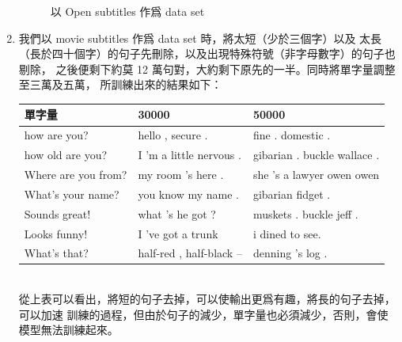 \documentclass[12pt, a4paper]{article}
\theoremstyle{mystyle}	%
\begin{document}
\begin{enumerate}
\begin{figure}[!htb]
    \caption{以 Open subtitles 作爲 data set}
    \label{fig:open-per}
   \endminipage
  \end{figure}
\item 我們以 movie subtitles 作爲 data set 時，將太短（少於三個字）以及
  太長（長於四十個字）的句子先刪除，以及出現特殊符號（非字母數字）的句子也剔除，
  之後便剩下約莫 12 萬句對，大約剩下原先的一半。同時將單字量調整至三萬及五萬，
  所訓練出來的結果如下：\\
  \begin{tabular}{lll}
    \hline
    單字量              & 30000                    & 50000 \\
    \hline
    \hline
    how are you?        & hello , secure .         & fine . domestic .\\
    \hline
    how old are you?    & I 'm a little nervous .  & gibarian . buckle wallace .\\
    \hline
    Where are you from? & my room 's here .        & she 's a lawyer owen owen \\
    \hline
    What's your name?   & you know my name .       & gibarian fidget .\\
    \hline
    Sounds great!       & what 's he got ?         & muskets . buckle jeff .\\
    \hline
    Looks funny!        & I 've got a trunk        & i dined to see.\\
    \hline
    What's that?        & half-red , half-black -- & denning 's log .\\
    \hline
  \end{tabular} \\
  從上表可以看出，將短的句子去掉，可以使輸出更爲有趣，將長的句子去掉，可以加速
  訓練的過程，但由於句子的減少，單字量也必須減少，否則，會使模型無法訓練起來。


\end{enumerate}
\end{document}
